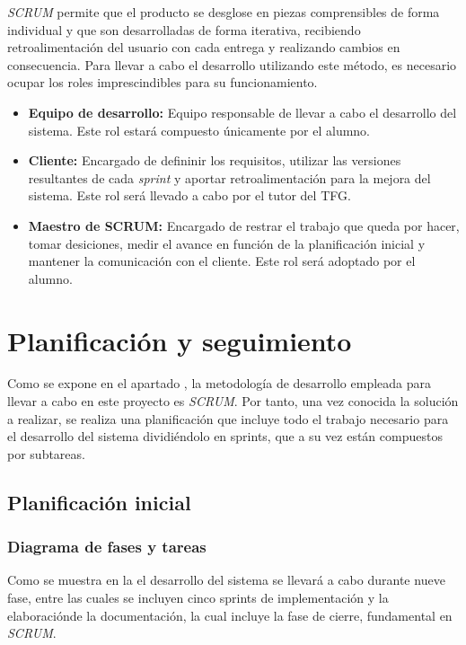 \documentclass[12pt]{article}
\begin{document}
    \textit{SCRUM} permite que el producto se desglose en piezas comprensibles de forma individual y que son desarrolladas de forma iterativa, recibiendo retroalimentación del usuario con cada entrega y realizando cambios en consecuencia. Para llevar a cabo el desarrollo utilizando este método, es necesario ocupar los roles imprescindibles para su funcionamiento.

    \begin{itemize}
        \item \textbf{Equipo de desarrollo:} Equipo responsable de llevar a cabo el desarrollo del sistema. Este rol estará compuesto únicamente por el alumno.
        \item \textbf{Cliente:} Encargado de defininir los requisitos, utilizar las versiones resultantes de cada \textit{sprint} y aportar retroalimentación para la mejora del sistema. Este rol será llevado a cabo por el tutor del TFG.
        \item \textbf{Maestro de SCRUM:} Encargado de restrar el trabajo que queda por hacer, tomar desiciones, medir el avance en función de la planificación inicial y mantener la comunicación con el cliente. Este rol será adoptado por el alumno.
    \end{itemize}

\section{Planificación y seguimiento}
    Como se expone en el apartado , la metodología de desarrollo empleada para llevar a cabo en este proyecto es \textit{SCRUM}. Por tanto, una vez conocida la solución a realizar, se realiza una planificación que incluye todo el trabajo necesario para el desarrollo del sistema dividiéndolo en sprints, que a su vez están compuestos por subtareas.

    \subsection{Planificación inicial}
        \subsubsection{Diagrama de fases y tareas}
        Como se muestra en la  el desarrollo del sistema se llevará a cabo durante nueve fase, entre las cuales se incluyen cinco sprints de implementación y la elaboraciónde la documentación, la cual incluye la fase de cierre, fundamental en \textit{SCRUM}.
\end{document}
